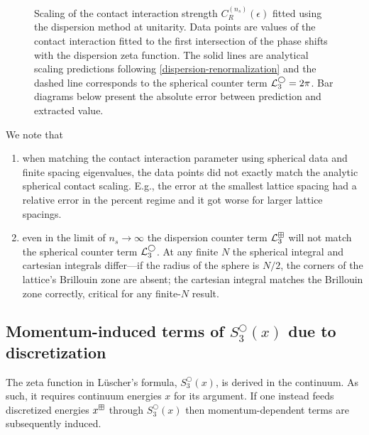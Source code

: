 \begin{figure}[!htb]
	\centering
    \scalebox{0.7}{}
    \caption{
        Scaling of the contact interaction strength $C_R^{(n_s)}(\epsilon)$ fitted using the dispersion method at unitarity.
        Data points are values of the contact interaction fitted to the first intersection of the phase shifts with the dispersion zeta function.
        The solid lines are analytical scaling predictions following \eqref{dispersion-renormalization} and the dashed line corresponds to the spherical counter term $ \mathcal{L}^{\bigcirc}_3 = 2 \pi$.
        Bar diagrams below present the absolute error between prediction and extracted value.
    }
    \label{fig:dispersion running of strength}
\end{figure}

We note that
\begin{enumerate}
	\item when matching the contact interaction parameter using spherical \Luscher data and finite spacing eigenvalues, the data points did not exactly match the analytic spherical contact scaling.
	E.g., the error at the smallest lattice spacing had a relative error in the percent regime and it got worse for larger lattice spacings.
	\item even in the limit of $n_s \to \infty$ the dispersion counter term $\mathcal{L}^\boxplus_3$ will not match the spherical counter term $\mathcal{L}^{\bigcirc}_3$.
At any finite $N$ the spherical integral and cartesian integrals differ---if the radius of the sphere is $N/2$, the corners of the lattice's Brillouin zone are absent; the cartesian integral matches the Brillouin zone correctly, critical for any finite-$N$ result.
\end{enumerate}



\subsection{Momentum-induced terms of  \texorpdfstring{$S^\bigcirc_3(x)$}{S3-spherical} due to discretization\label{sect:3d induced momenta}}
The zeta function in L\"uscher's formula, $S^\bigcirc_3(x)$, is derived in the continuum.
As such, it requires continuum energies $x$ for its argument.
If one instead feeds discretized energies $x^\boxplus$ through $S^\bigcirc_3(x)$ then momentum-dependent terms are subsequently induced.

